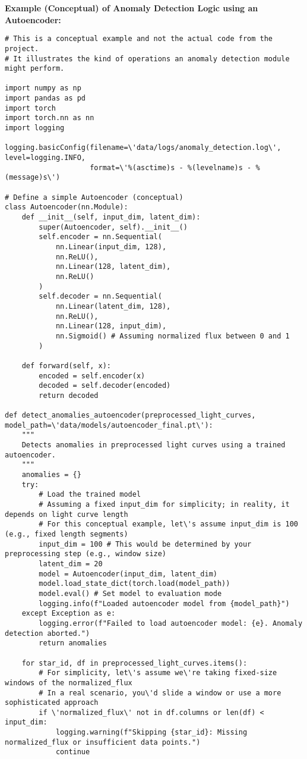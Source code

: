 \documentclass{article}
\begin{document}
\textbf{Example (Conceptual) of Anomaly Detection Logic using an Autoencoder:}
\begin{lstlisting}[caption={Conceptual Anomaly Detection Logic}]
# This is a conceptual example and not the actual code from the project.
# It illustrates the kind of operations an anomaly detection module might perform.

import numpy as np
import pandas as pd
import torch
import torch.nn as nn
import logging

logging.basicConfig(filename=\'data/logs/anomaly_detection.log\', level=logging.INFO,
                    format=\'%(asctime)s - %(levelname)s - %(message)s\')

# Define a simple Autoencoder (conceptual)
class Autoencoder(nn.Module):
    def __init__(self, input_dim, latent_dim):
        super(Autoencoder, self).__init__()
        self.encoder = nn.Sequential(
            nn.Linear(input_dim, 128),
            nn.ReLU(),
            nn.Linear(128, latent_dim),
            nn.ReLU()
        )
        self.decoder = nn.Sequential(
            nn.Linear(latent_dim, 128),
            nn.ReLU(),
            nn.Linear(128, input_dim),
            nn.Sigmoid() # Assuming normalized flux between 0 and 1
        )

    def forward(self, x):
        encoded = self.encoder(x)
        decoded = self.decoder(encoded)
        return decoded

def detect_anomalies_autoencoder(preprocessed_light_curves, model_path=\'data/models/autoencoder_final.pt\'):
    """
    Detects anomalies in preprocessed light curves using a trained autoencoder.
    """
    anomalies = {}
    try:
        # Load the trained model
        # Assuming a fixed input_dim for simplicity; in reality, it depends on light curve length
        # For this conceptual example, let\'s assume input_dim is 100 (e.g., fixed length segments)
        input_dim = 100 # This would be determined by your preprocessing step (e.g., window size)
        latent_dim = 20
        model = Autoencoder(input_dim, latent_dim)
        model.load_state_dict(torch.load(model_path))
        model.eval() # Set model to evaluation mode
        logging.info(f"Loaded autoencoder model from {model_path}")
    except Exception as e:
        logging.error(f"Failed to load autoencoder model: {e}. Anomaly detection aborted.")
        return anomalies

    for star_id, df in preprocessed_light_curves.items():
        # For simplicity, let\'s assume we\'re taking fixed-size windows of the normalized_flux
        # In a real scenario, you\'d slide a window or use a more sophisticated approach
        if \'normalized_flux\' not in df.columns or len(df) < input_dim:
            logging.warning(f"Skipping {star_id}: Missing normalized_flux or insufficient data points.")
            continue


\end{lstlisting}
\end{document}
